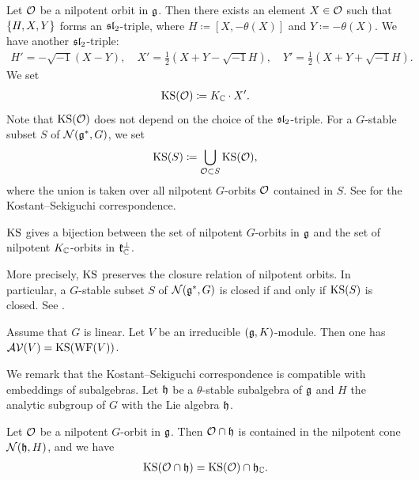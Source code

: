 Let $\mathcal{O}$ be a nilpotent orbit in $\mathfrak{g}$.
Then there exists an element $X \in \mathcal{O}$ such that $\left\{H, X, Y \right\}$ forms an $\mathfrak{sl}_2$-triple, where $H\coloneq [X, -\theta(X)]$ and $Y\coloneq -\theta(X)$.
We have another $\mathfrak{sl}_2$-triple:
\begin{align*}
	H' = -\sqrt{-1}(X-Y), \quad X'=\frac{1}{2}(X+Y-\sqrt{-1}H), \quad Y'=\frac{1}{2}(X+Y+\sqrt{-1}H).
\end{align*}
We set
\begin{align*}
	\mathrm{KS}(\mathcal{O}) \coloneq K_{\mathbb{C}} \cdot X'.
\end{align*}
Note that $\mathrm{KS}(\mathcal{O})$ does not depend on the choice of the $\mathfrak{sl}_2$-triple.
For a $G$-stable subset $S$ of $\mathcal{N}(\mathfrak{g}^*, G)$, we set
\begin{align*}
	\mathrm{KS}(S) \coloneq \bigcup_{\mathcal{O} \subset S} \mathrm{KS}(\mathcal{O}),
\end{align*}
where the union is taken over all nilpotent $G$-orbits $\mathcal{O}$ contained in $S$.
See \cite[Theorem 9.5.1]{CoMc93} for the Kostant--Sekiguchi correspondence.

\begin{fact} \label{fact:KostantSekiguchi}
	$\mathrm{KS}$ gives a bijection between the set of nilpotent $G$-orbits in $\mathfrak{g}$ and the set of nilpotent $K_{\mathbb{C}}$-orbits in $\mathfrak{k}_{\mathbb{C}}^\perp$.
\end{fact}

More precisely, $\mathrm{KS}$ preserves the closure relation of nilpotent orbits.
In particular, a $G$-stable subset $S$ of $\mathcal{N}(\mathfrak{g}^*, G)$ is closed if and only if $\mathrm{KS}(S)$ is closed.
See \cite{BaSe98}.

\begin{fact} \label{fact:SchmidVilonen}
	Assume that $G$ is linear.
	Let $V$ be an irreducible $(\mathfrak{g}, K)$-module.
	Then one has $\mathcal{AV}(V) = \mathrm{KS}(\mathrm{WF}(V))$.
\end{fact}

We remark that the Kostant--Sekiguchi correspondence is compatible with embeddings of subalgebras.
Let $\mathfrak{h}$ be a $\theta$-stable subalgebra of $\mathfrak{g}$ and $H$ the analytic subgroup of $G$ with the Lie algebra $\mathfrak{h}$.

\begin{proposition} \label{prop:KostantSekiguchiCompatible}
	Let $\mathcal{O}$ be a nilpotent $G$-orbit in $\mathfrak{g}$.
	Then $\mathcal{O}\cap \mathfrak{h}$ is contained in the nilpotent cone $\mathcal{N}(\mathfrak{h}, H)$, and we have
	\begin{align*}
		\mathrm{KS}(\mathcal{O}\cap \mathfrak{h}) = \mathrm{KS}(\mathcal{O}) \cap \mathfrak{h}_{\mathbb{C}}.
	\end{align*}
\end{proposition}

